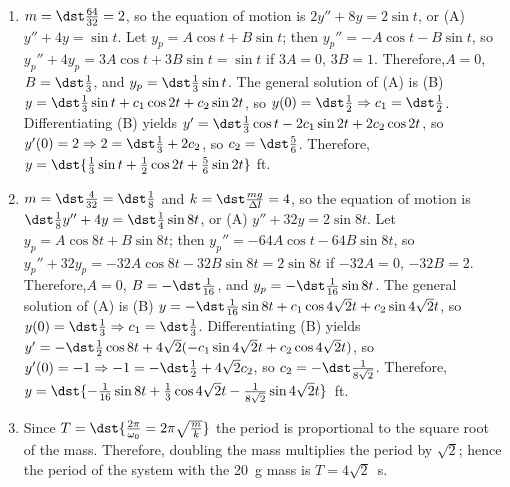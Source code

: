\documentclass[openany]{book}
\newenvironment{sectionSolutions}{
 \begin{enumerate}[item-label={\thesection.\arabic{enumi}.}]
}{
 \end{enumerate}
}
\begin{document}
\begin{sectionSolutions}
\item
$m=\dst\frac{64}{32}=2$, so the equation of motion is $2y''+8y=2\sin t$,
or (A) $y''+4y=\sin t$. Let $y_p=A\cos t+B\sin t$; then $y_p''=-A\cos
t-B\sin t$, so $y_p''+4y_p=3A\cos t+3B\sin t= \sin t$ if $3A=0$,
$3B=1$. Therefore,$A=0$, $B=\dst\frac{1}{3}$, and $y_p=\dst\frac{1}{3}\sin
t$. The general solution of
(A) is (B) $y=\dst\frac{1}{3}\sin
t+c_1\cos2t+c_2\sin2t$, so $y(0)=\dst\frac{1}{2}\Rightarrow
c_1=\dst\frac{1}{2}$. Differentiating (B) yields $y'=\dst\frac{1}{3}\cos
t-2c_1\sin2t+2c_2\cos2t$, so $y'(0)=2\Rightarrow
2=\dst\frac{1}{3}+2c_2$, so $c_2=\dst\frac{5}{6}$. Therefore,
$y=\dst{\frac{1}{3}\sin t+\frac{1}{2}\cos2t+\frac{5}{6}\sin2t}$ ft.


\item
$m=\dst\frac{4}{32}=\dst\frac{1}{8}$ and $k=\dst\frac{mg}{\Delta l}=4$, so
the equation of motion is $\dst\frac{1}{8}y''+4y=\dst\frac{1}{4}\sin8t$,
or (A) $y''+32y=2\sin8t$. Let $y_p=A\cos8t+B\sin8t$; then
$y_p''=-64A\cos t-64B\sin8t$, so $y_p''+32y_p=-32A\cos8t-32B\sin8t=
2\sin8t$ if $-32A=0$, $-32B=2$. Therefore,$A=0$, $B=-\dst\frac{1}{16}$,
and $y_p=-\dst\frac{1}{16}\sin8t$. The general solution of (A) is (B)
$y=-\dst\frac{1}{16}\sin8t+c_1\cos4\sqrt2t+c_2\sin4\sqrt2t$, so
$y(0)=\dst\frac{1}{3}\Rightarrow c_1=\dst\frac{1}{3}$. Differentiating (B)
yields $y'=-\dst\frac{1}{2}\cos
8t+4\sqrt2(-c_1\sin4\sqrt2t+c_2\cos4\sqrt2t)$, so $y'(0)=-1\Rightarrow
-1=-\dst\frac{1}{2}+4\sqrt2c_2$, so $c_2=-\dst\frac{1}{8\sqrt2}$.
Therefore,$y=\dst{-\frac{1}{16}\sin8t+\frac{1}{3}\cos4\sqrt2t
-\frac{1}{8\sqrt2 }\sin 4\sqrt2t}$~ft.




\item
Since $T=\dst{\frac{2\pi}{\omega_0}=2\pi\sqrt\frac{m}{ k}}$
the period is proportional to the square root of the mass.
Therefore, doubling the mass multiplies the period by $\sqrt2$;
hence the period of the system with the \qty{20}{\gram} mass is
 $T=4\sqrt{2}$~s.



\end{sectionSolutions}
\end{document}
